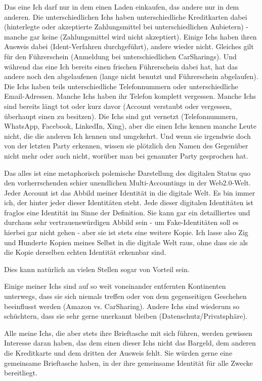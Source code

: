 Das eine Ich darf nur in dem einen Laden einkaufen, das andere nur in dem anderen. Die unterschiedlichen Ichs haben unterschiedliche Kreditkarten dabei (hinterlegte oder akzeptierte Zahlungsmittel bei unterschiedlichen Anbietern) - manche gar keine (Zahlungsmittel wird nicht akzeptiert). Einige Ichs haben ihren Ausweis dabei (Ident-Verfahren durchgeführt), andere wieder nicht. Gleiches gilt für den Führerschein (Anmeldung bei unterschiedlichen CarSharings). Und während das eine Ich bereits einen frischen Führerschein dabei hat, hat das andere noch den abgelaufenen (lange nicht benutzt und Führerschein abgelaufen). Die Ichs haben teils unterschiedliche Telefonnummern oder unterschiedliche Email-Adressen. Manche Ichs haben ihr Telefon komplett vergessen. Manche Ichs sind bereits längt tot oder kurz davor (Account verstaubt oder vergessen, überhaupt einen zu besitzen). Die Ichs sind gut vernetzt (Telefonnummern, WhatsApp, Facebook, LinkedIn, Xing), aber die einen Ichs kennen manche Leute nicht, die die anderen Ich kennen und umgekehrt. Und wenn sie irgendwie doch von der letzten Party erkennen, wissen sie plötzlich den Namen des Gegenüber nicht mehr oder auch nicht, worüber man bei genannter Party gesprochen hat.

Das alles ist eine metaphorisch polemische Darstellung des digitalen Status quo den vorherrschenden schier unendlichen Multi-Accountings in der Web2.0-Welt. Jeder Account ist das Abbild meiner Identität in die digitale Welt. Es bin immer ich, der hinter jeder dieser Identitäten steht. Jede dieser digitalen Identitäten ist fraglos eine Identität im Sinne der Definition. Sie kann gar ein detailliertes und durchaus sehr vertrauenswürdigen Abbild sein - um Fake-Identitäten soll es hierbei gar nicht gehen - aber sie ist stets eine weitere Kopie. Ich lasse also Zig und Hunderte Kopien meines Selbst in die digitale Welt raus, ohne dass sie als die Kopie derselben echten Identität erkennbar sind.

Dies kann natürlich an vielen Stellen sogar von Vorteil sein.

Einige meiner Ichs sind auf so weit voneinander entfernten Kontinenten unterwegs, dass sie sich niemals treffen oder von dem gegenseitigen Geschehen beeinflusst werden (Amazon vs. CarSharing). Andere Ichs sind wiederum so schüchtern, dass sie sehr gerne unerkannt bleiben (Datenschutz/Privatsphäre). 

Alle meine Ichs, die aber stets ihre Brieftasche mit sich führen, werden gewissen Interesse daran haben, das dem einen dieser Ichs nicht das Bargeld, dem anderen die Kreditkarte und dem dritten der Ausweis fehlt. Sie würden gerne eine gemeinsame Brieftasche haben, in der ihre gemeinsame Identität für alle Zwecke bereitliegt.

